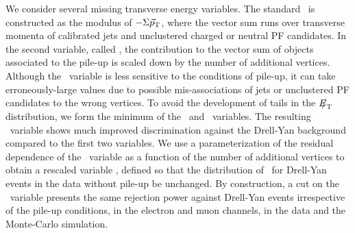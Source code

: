 We consider several missing transverse energy variables. The standard \PFMET\ is constructed as the modulus of $-\Sigma \vec{p}_{\mathrm{T}}$, where the vector sum runs over transverse momenta of calibrated jets and unclustered charged or neutral PF candidates.  In the second variable, called \PUMET, the contribution to the vector sum of objects associated to the pile-up is scaled down by the number of additional vertices. Although the \PUMET\ variable is less sensitive to the conditions of pile-up, it can take erroneously-large values due to possible mis-associations of jets or unclustered PF candidates to the wrong vertices.  To avoid the development of tails in the ${E\!\!\!/}_{\mathrm{T}}$ distribution, we form the minimum of the \PFMET\ and \PUMET\ variables. The resulting \PUMETMIN\ variable shows much improved discrimination against the Drell-Yan background compared to the first two variables.  We use a parameterization of the residual dependence of the \PUMETMIN\ variable as a function of the number of additional vertices to obtain a rescaled variable \CORRMET, defined so that the distribution of \PUMETMIN\ for Drell-Yan events in the data without pile-up be unchanged. By construction, a cut on the \CORRMET\ variable presents the same rejection power against Drell-Yan events irrespective of the pile-up conditions, in the electron and muon channels, in the data and the Monte-Carlo simulation.

